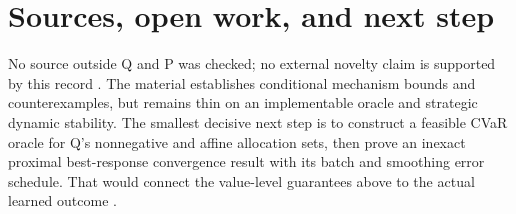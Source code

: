 \documentclass{article}
\begin{document}
\section{Sources, open work, and next step}

No source outside Q and P was checked; no external novelty claim is supported by this record . The material establishes conditional mechanism bounds and counterexamples, but remains thin on an implementable oracle and strategic dynamic stability. The smallest decisive next step is to construct a feasible CVaR oracle for Q's nonnegative and affine allocation sets, then prove an inexact proximal best-response convergence result with its batch and smoothing error schedule. That would connect the value-level guarantees above to the actual learned outcome .
\end{document}
